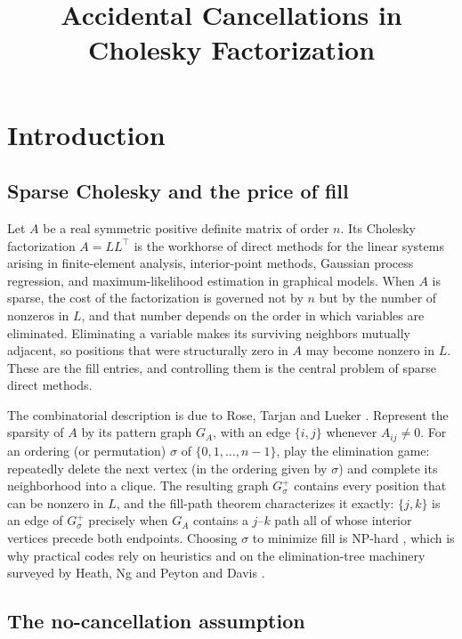 \documentclass[11pt]{article}
\title[Accidental Cancellations]{Accidental Cancellations in Cholesky Factorization}
\theoremstyle{plain}
\theoremstyle{definition}
\theoremstyle{remark}
\begin{document}
\maketitle




    

\section{Introduction}
\begin{humanblock}
\subsection{Sparse Cholesky and the price of fill}

Let $A$ be a real symmetric positive definite matrix of order $n$. Its Cholesky factorization $A = LL^\top$ is the workhorse of direct methods for the linear systems arising in finite-element analysis, interior-point methods, Gaussian process regression, and maximum-likelihood estimation in graphical models. When $A$ is sparse, the cost of the factorization is governed not by $n$ but by the number of nonzeros in $L$, and that number depends on the order in which variables are eliminated. Eliminating a variable makes its surviving neighbors mutually adjacent, so positions that were structurally zero in $A$ may become nonzero in $L$. These are the fill entries, and controlling them is the central problem of sparse direct methods.

The combinatorial description is due to Rose, Tarjan and Lueker \cite{Rose}. Represent the sparsity of $A$ by its pattern graph $G_A$, with an edge $\{i,j\}$ whenever $A_{ij} \neq 0$. For an ordering (or permutation) $\sigma$ of $\{0,1,\dots,n-1\}$, play the elimination game: repeatedly delete the next vertex (in the ordering given by $\sigma$) and complete its neighborhood into a clique. The resulting graph $G^+_\sigma$ contains every position that can be nonzero in $L$, and the fill-path theorem characterizes it exactly: $\{j,k\}$ is an edge of $G^+_\sigma$ precisely when $G_A$ contains a $j$--$k$ path all of whose interior vertices precede both endpoints. Choosing $\sigma$ to minimize fill is NP-hard \cite{Yannakakis}, which is why practical codes rely on heuristics and on the elimination-tree machinery surveyed by Heath, Ng and Peyton \cite{Heath} and Davis \cite{Davis}.

\subsection{The no-cancellation assumption}


\end{humanblock}
\end{document}
